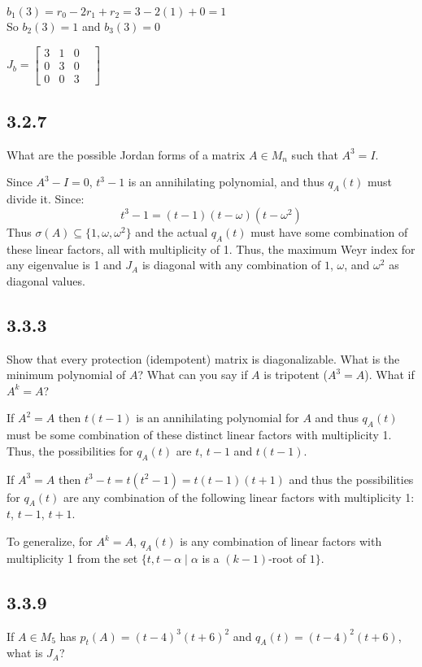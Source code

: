 \documentclass[letterpaper,12pt,fleqn]{article}
\renewcommand{\o}{\sigma}
\newcommand{\w}{\omega}
\renewcommand{\a}{\alpha}
\begin{document}
$b_1(3)=r_0-2r_1+r_2=3-2(1)+0=1$ \\
So $b_2(3)=1$ and $b_3(3)=0$

$J_b=\begin{bmatrix} 3 & 1 & 0 \\ 0 & 3 & 0 & \\ 0 & 0 & 3 \end{bmatrix}$

\subsection*{3.2.7}

What are the possible Jordan forms of a matrix $A\in M_n$ such that $A^3=I$.

Since $A^3-I=0$, $t^3-1$ is an annihilating polynomial, and thus $q_A(t)$ must divide
it. Since:
\[t^3-1=(t-1)(t-\w)(t-\w^2)\]
Thus $\o(A)\subseteq\{1,\w,\w^2\}$ and the actual $q_A(t)$ must have some combination of
these linear factors, all with multiplicity of 1. Thus, the maximum Weyr index for any
eigenvalue is 1 and $J_A$ is diagonal with any combination of $1$, $\w$, and $\w^2$ as
diagonal values.

\subsection*{3.3.3}

Show that every protection (idempotent) matrix is diagonalizable. What is the minimum
polynomial of $A$? What can you say if $A$ is tripotent ($A^3=A$). What if $A^k=A$?

If $A^2=A$ then $t(t-1)$ is an annihilating polynomial for $A$ and thus $q_A(t)$ must be
some combination of these distinct linear factors with multiplicity 1. Thus, the
possibilities for $q_A(t)$ are $t$, $t-1$ and $t(t-1)$.

If $A^3=A$ then $t^3-t=t(t^2-1)=t(t-1)(t+1)$ and thus the possibilities for $q_A(t)$ are
any combination of the following linear factors with multiplicity 1: $t$, $t-1$, $t+1$.

To generalize, for $A^k=A$, $q_A(t)$ is any combination of linear factors with
multiplicity 1 from the set $\{t,t-\a\mid\a$ is a $(k-1)$-root of $1\}$.

\subsection*{3.3.9}

If $A\in M_5$ has $p_t(A)=(t-4)^3(t+6)^2$ and $q_A(t)=(t-4)^2(t+6)$, what is $J_A$?
\end{document}
